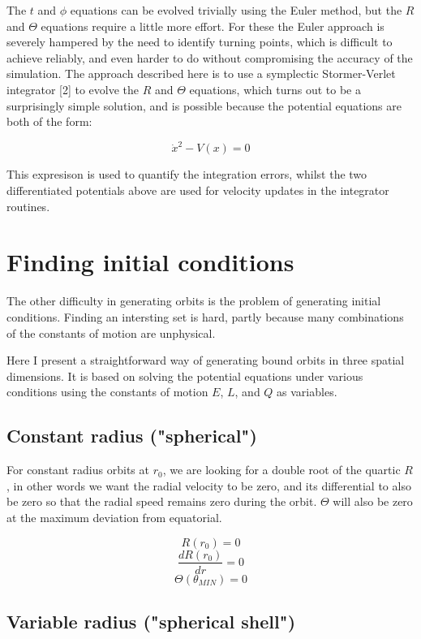 \documentclass[11pt]{article}
\begin{document}
The $t$ and $\phi$ equations can be evolved trivially using the Euler method, but the $R$ and $\Theta$ equations require a little more effort.  For these the Euler approach is severely hampered by the need to identify turning points, which is difficult to achieve reliably, and even harder to do without compromising the accuracy of the simulation.  The approach described here is to use a symplectic Stormer-Verlet integrator [2] to evolve the $R$ and $\Theta$ equations, which turns out to be a surprisingly simple solution, and is possible because the potential equations are both of the form:

$$
\dot x^2 - V(x) = 0
$$

This expresison is used to quantify the integration errors, whilst the two differentiated potentials above are used for velocity updates in the integrator routines.

\section{Finding initial conditions}

The other difficulty in generating orbits is the problem of generating initial conditions.  Finding an intersting set is hard, partly because many combinations of the constants of motion are unphysical.

Here I present a straightforward way of generating bound orbits in three spatial dimensions.  It is based on solving the potential equations under various conditions using the constants of motion $E$, $L$, and $Q$ as variables.

\subsection{Constant radius ("spherical")}

For constant radius orbits at $r_0$, we are looking for a double root of the quartic $R$, in other words we want the radial velocity to be zero, and its differential to also be zero so that the radial speed remains zero during the orbit.  $\Theta$ will also be zero at the maximum deviation from equatorial. 

$$
R(r_0) = 0
$$
$$
\frac{d R(r_0)}{d r} = 0
$$
$$
\Theta(\theta_{MIN}) = 0
$$

\subsection{Variable radius ("spherical shell")}
\end{document}
